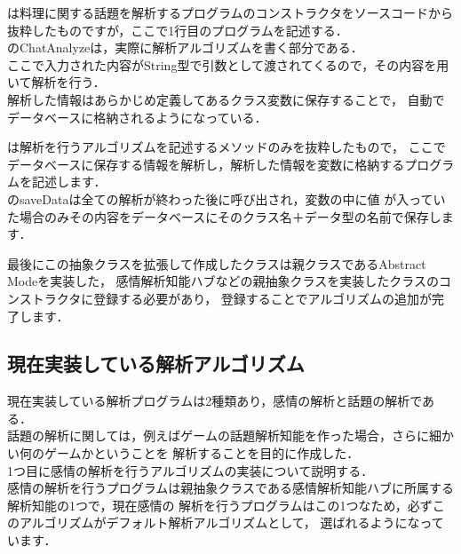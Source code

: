 
は料理に関する話題を解析するプログラムのコンストラクタをソースコードから
抜粋したものですが，ここで1行目のプログラムを記述する．
\\

のChatAnalyzeは，実際に解析アルゴリズムを書く部分である．\\
ここで入力された内容がString型で引数として渡されてくるので，その内容を用いて解析を行う．\\
解析した情報はあらかじめ定義してあるクラス変数に保存することで，
自動でデータベースに格納されるようになっている．

は解析を行うアルゴリズムを記述するメソッドのみを抜粋したもので，
ここでデータベースに保存する情報を解析し，解析した情報を変数に格納するプログラムを記述します．
\\

のsaveDataは全ての解析が終わった後に呼び出され，変数の中に値
が入っていた場合のみその内容をデータベースにそのクラス名＋データ型の名前で保存します．

最後にこの抽象クラスを拡張して作成したクラスは親クラスであるAbstract Modeを実装した，
感情解析知能ハブなどの親抽象クラスを実装したクラスのコンストラクタに登録する必要があり，
登録することでアルゴリズムの追加が完了します．\\

\subsection{現在実装している解析アルゴリズム}
現在実装している解析プログラムは2種類あり，感情の解析と話題の解析である．\\

話題の解析に関しては，例えばゲームの話題解析知能を作った場合，さらに細かい何のゲームかということを
解析することを目的に作成した．\\
1つ目に感情の解析を行うアルゴリズムの実装について説明する．\\

感情の解析を行うプログラムは親抽象クラスである感情解析知能ハブに所属する解析知能の1つで，現在感情の
解析を行うプログラムはこの1つなため，必ずこのアルゴリズムがデフォルト解析アルゴリズムとして，
選ばれるようになっています．\\


